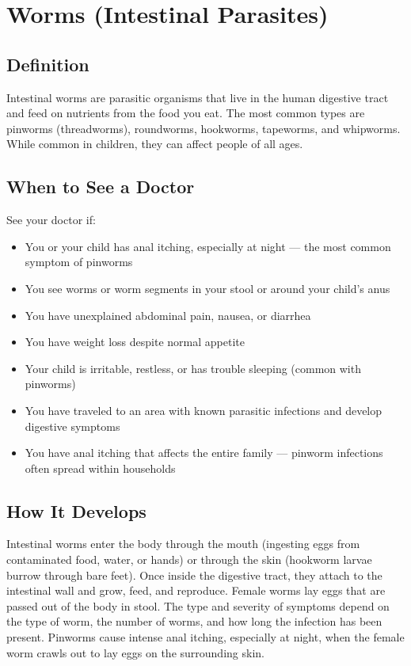 \chapter{Worms (Intestinal Parasites)}

\section*{Definition}
Intestinal worms are parasitic organisms that live in the human digestive tract and feed on nutrients from the food you eat. The most common types are pinworms (threadworms), roundworms, hookworms, tapeworms, and whipworms. While common in children, they can affect people of all ages.

\section*{When to See a Doctor}
See your doctor if:
\begin{itemize}
  \item You or your child has anal itching, especially at night — the most common symptom of pinworms
  \item You see worms or worm segments in your stool or around your child's anus
  \item You have unexplained abdominal pain, nausea, or diarrhea
  \item You have weight loss despite normal appetite
  \item Your child is irritable, restless, or has trouble sleeping (common with pinworms)
  \item You have traveled to an area with known parasitic infections and develop digestive symptoms
  \item You have anal itching that affects the entire family — pinworm infections often spread within households
\end{itemize}

\section*{How It Develops}
Intestinal worms enter the body through the mouth (ingesting eggs from contaminated food, water, or hands) or through the skin (hookworm larvae burrow through bare feet). Once inside the digestive tract, they attach to the intestinal wall and grow, feed, and reproduce. Female worms lay eggs that are passed out of the body in stool. The type and severity of symptoms depend on the type of worm, the number of worms, and how long the infection has been present. Pinworms cause intense anal itching, especially at night, when the female worm crawls out to lay eggs on the surrounding skin.

